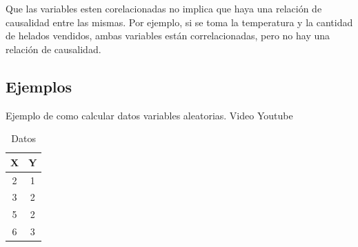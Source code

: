 \documentclass[../main.tex]{subfiles}
\begin{document}
        Que las variables esten corelacionadas no implica que haya una relación de causalidad entre las mismas. Por ejemplo, si se toma la temperatura y la cantidad de helados vendidos, ambas variables están correlacionadas, pero no hay una relación de causalidad.

    \subsection{Ejemplos}
        \begin{example}
            Ejemplo de como calcular datos variables aleatorias. Video Youtube \cite{ejemplo_variables_aleatorias}

            \begin{table}[h]
                \centering
                \begin{tabular}{|c|c|}
                \hline
                \textbf{X} & \textbf{Y} \\ \hline
                2          & 1          \\ \hline
                3          & 2          \\ \hline
                5          & 2          \\ \hline
                6          & 3          \\ \hline
                \end{tabular}
                \caption{Datos}
            \end{table}


\end{example}
\end{document}
